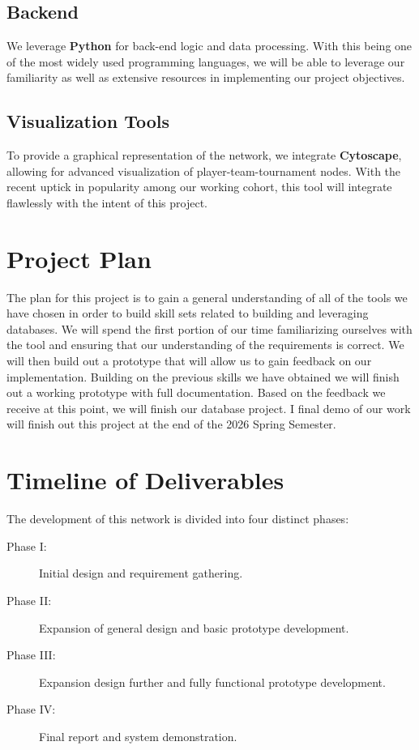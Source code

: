 \documentclass[sigconf]{acmart}
\begin{document}
\subsection{Backend}
We leverage \textbf{Python} for back-end logic and data processing. With this being one of the most widely used programming languages, we will be able to leverage our familiarity as well as extensive resources in implementing our project objectives.

\subsection{Visualization Tools}
To provide a graphical representation of the network, we integrate \textbf{Cytoscape}, allowing for advanced visualization of player-team-tournament nodes.  With the recent uptick in popularity among our working cohort, this tool will integrate flawlessly with the intent of this project.

\section{Project Plan}
The plan for this project is to gain a general understanding of all of the tools we have chosen in order to build skill sets related to building and leveraging databases.  We will spend the first portion of our time familiarizing ourselves with the tool and ensuring that our understanding of the requirements is correct.  We will then build out a prototype that will allow us to gain feedback on our implementation.  Building on the previous skills we have obtained we will finish out a working prototype with full documentation.  Based on the feedback we receive at this point, we will finish our database project.  I final demo of our work will finish out this project at the end of the 2026 Spring Semester.


\section{Timeline of Deliverables}
The development of this network is divided into four distinct phases:
\begin{description}
    \item[Phase I:] Initial design and requirement gathering.
    \item[Phase II:] Expansion of general design and basic prototype development.
    \item[Phase III:] Expansion design further and fully functional prototype development.
    \item[Phase IV:] Final report and system demonstration.
\end{description}
\end{document}
